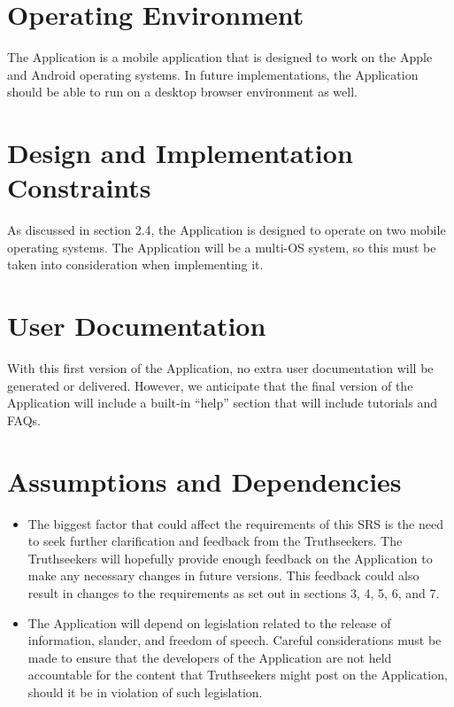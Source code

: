 \section{Operating Environment}

The Application is a mobile application that is designed to work on the Apple and Android operating systems. In future implementations, the Application should be able to run on a desktop browser environment as well.

\section{Design and Implementation Constraints}

As discussed in section 2.4, the Application is designed to operate on two mobile operating systems. The Application will be a multi-OS system, so this must be taken into consideration when implementing it.

\section{User Documentation}

With this first version of the Application, no extra user documentation will be generated or delivered. However, we anticipate that the final version of the Application will include a built-in “help” section that will include tutorials and FAQs.


\section{Assumptions and Dependencies}

\begin{itemize}
\item The biggest factor that could affect the requirements of this SRS is the need to seek further clarification and feedback from the Truthseekers. The Truthseekers will hopefully provide enough feedback on the Application to make any necessary changes in future versions. This feedback could also result in changes to the requirements as set out in sections 3, 4, 5, 6, and 7.

\item The Application will depend on legislation related to the release of information, slander, and freedom of speech. Careful considerations must be made to ensure that the developers of the Application are not held accountable for the content that Truthseekers might post on the Application, should it be in violation of such legislation.
\end{itemize}

